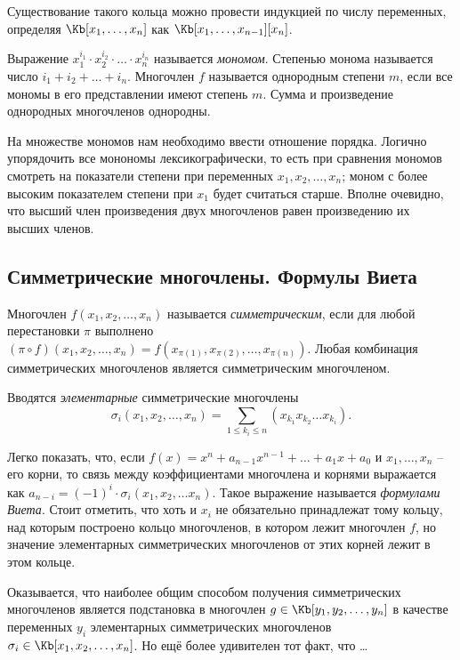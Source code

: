 Существование такого кольца можно провести индукцией по числу переменных, определяя $\Kb[x_1,\dots,x_n]$ как $\Kb[x_1,\dots,x_{n-1}][x_n]$.

Выражение $x_1^{i_1}\cdot x_2^{i_2}\cdot\dots\cdot x_n^{i_n}$ называется \emph{мономом}. Степенью монома называется число $i_1+i_2+\dots+i_n$. Многочлен $f$ называется однородным степени $m$, если все мономы в его представлении имеют степень $m$. Сумма и произведение однородных многочленов однородны.

На множестве мономов нам необходимо ввести отношение порядка. Логично упорядочить все монономы лексикографически, то есть при сравнения мономов смотреть на показатели степени при переменных $x_1, x_2,\dots, x_n$; моном с более высоким показателем степени при $x_1$ будет считаться старше. Вполне очевидно, что высший член произведения двух многочленов равен произведению их высших членов.

\subsection{Симметрические многочлены. Формулы Виета}

\begin{df}
  Многочлен $f(x_1,x_2,\dots,x_n)$ называется \emph{симметрическим}, если для любой перестановки $\pi$ выполнено $(\pi\circ f)(x_1,x_2,\dots,x_n)=f(x_{\pi(1)},x_{\pi(2)},\dots,x_{\pi(n)})$. Любая комбинация симметрических многочленов является симметрическим многочленом.

  Вводятся \emph{элементарные} симметрические многочлены $$\sigma_i(x_1,x_2,\dots,x_n)=\sum\limits_{1\le k_i\le n}\left(x_{k_1}x_{k_2}\dots x_{k_i}\right).$$
\end{df}

Легко показать, что, если $f(x)=x^n+a_{n-1}x^{n-1}+\dots+a_1x+a_0$ и
$x_1,\dots,x_n$ -- его корни, то связь между коэффициентами многочлена
и корнями выражается как $a_{n-i}=(-1)^i\cdot \sigma_i(x_1,x_2,\dots
x_n)$. Такое выражение называется \emph{формулами
  Виета}. Стоит отметить, что хоть и $x_i$ не
обязательно принадлежат тому кольцу, над которым построено кольцо
многочленов, в котором лежит многочлен $f$, но значение элементарных
симметрических многочленов от этих корней лежит в этом кольце.

Оказывается, что наиболее общим способом получения симметрических многочленов является подстановка в многочлен $g\in\Kb[y_1,y_2,\dots,y_n]$ в качестве переменных $y_i$ элементарных симметрических многочленов $\sigma_i\in\Kb[x_1,x_2,\dots,x_n]$. Но ещё более удивителен тот факт, что \dots

